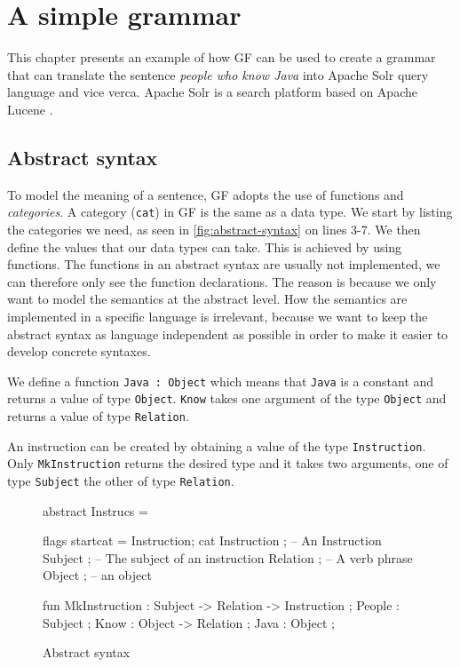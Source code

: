 \chapter{A simple grammar}\label{ch:simple-grammar}
This chapter presents an example of how GF can be used to create a grammar that can translate the sentence \emph{people who know Java} into Apache Solr query language and vice verca. Apache Solr is a search platform based on Apache Lucene \cite{kuc2011apache}.

\section{Abstract syntax}
To model the meaning of a sentence, GF adopts the use of functions and \emph{categories}. A category (\texttt{cat}) in GF is the same as a data type. We start by listing the categories we need, as seen in \autoref{fig:abstract-syntax} on lines 3-7. We then define the values that our data types can take. This is achieved by using functions. The functions in an abstract syntax are usually not implemented, we can therefore only see the function declarations. The reason is because we only want to model the semantics at the abstract level. How the semantics are implemented in a specific language is irrelevant, because we want to keep the abstract syntax as language independent as possible in order to make it easier to develop concrete syntaxes.

We define a function \texttt{Java : Object} which means that \texttt{Java} is a constant  and returns a value of type \texttt{Object}. \texttt{Know} takes one argument of the type \texttt{Object} and returns a value of type \texttt{Relation}.

An instruction can be created by obtaining a value of the type \texttt{Instruction}. Only \texttt{MkInstruction} returns the desired type and it takes two arguments, one of type \texttt{Subject} the other of type \texttt{Relation}.

\begin{figure}[H]
\begin{code}
abstract Instrucs = { 
  flags startcat = Instruction; 
  cat
    Instruction ; -- An Instruction
    Subject ;     -- The subject of an instruction
    Relation ;    -- A verb phrase
    Object ;      -- an object

  fun		 	  
    MkInstruction : Subject -> Relation -> Instruction ;
    People : Subject ;
    Know : Object -> Relation ;
    Java : Object ; 
}
\end{code}
\caption{Abstract syntax\label{fig:abstract-syntax}}
\end{figure}

